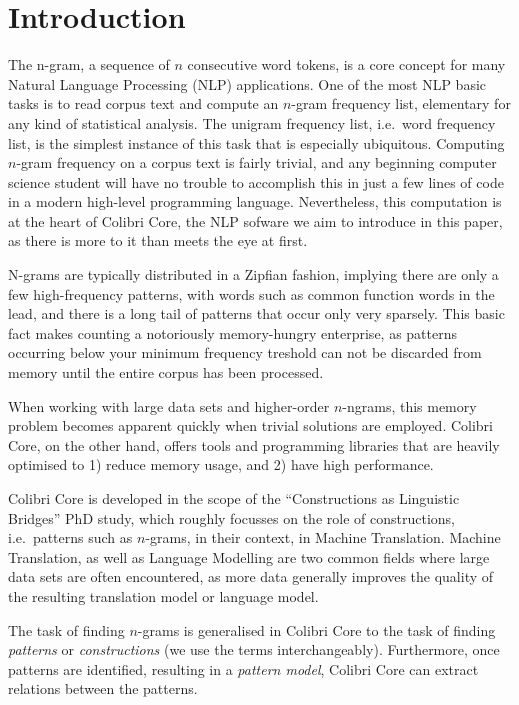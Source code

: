 



\section{Introduction}

The n-gram, a sequence of $n$ consecutive word tokens, is a core concept for
many Natural Language Processing (NLP) applications. One of the most NLP basic
tasks is to read corpus text and compute an $n$-gram frequency list, elementary
for any kind of statistical analysis. The unigram frequency list, i.e.\ word
frequency list, is the simplest instance of this task that is especially
ubiquitous. Computing $n$-gram frequency on a corpus text is fairly trivial,
and any beginning computer science student will have no trouble to accomplish
this in just a few lines of code in a modern high-level programming language.
Nevertheless, this computation is at the heart of Colibri Core, the NLP sofware
we aim to introduce in this paper, as there is more to it than meets the eye at
first.

N-grams are typically distributed in a Zipfian fashion, implying there are only
a few high-frequency patterns, with words such as common function words in the
lead, and there is a long tail of patterns that occur only very sparsely. This
basic fact makes counting a notoriously memory-hungry enterprise, as patterns
occurring below your minimum frequency treshold can not be discarded from
memory until the entire corpus has been processed. 

When working with large data sets and higher-order $n$-ngrams, this memory
problem becomes apparent quickly when trivial solutions are employed. Colibri
Core, on the other hand, offers tools and programming libraries that are
heavily optimised to 1) reduce memory usage, and 2) have high performance.

Colibri Core is developed in the scope of the ``Constructions as Linguistic
Bridges'' PhD study, which roughly focusses on the role of constructions, i.e.\ 
patterns such as $n$-grams, in their context, in Machine Translation. Machine
Translation, as well as Language Modelling are two common fields where large
data sets are often encountered, as more data generally improves the quality of
the resulting translation model or language model. 


The task of finding $n$-grams is generalised in Colibri Core to the task of
finding \emph{patterns} or \emph{constructions} (we use the terms
interchangeably). Furthermore, once patterns are identified, resulting in a
\emph{pattern model}, Colibri Core can extract relations between the patterns.


